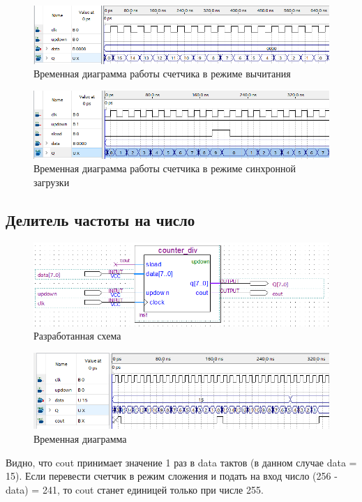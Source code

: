 \documentclass[a4paper,12pt]{article}
\begin{document}
    \begin{figure}[H]
        \centering
        \includegraphics[width=\linewidth]{wave_2_2}
        \caption{Временная диаграмма работы счетчика в режиме вычитания}
    \end{figure}

    \begin{figure}[H]
        \centering
        \includegraphics[width=\linewidth]{wave_2_3}
        \caption{Временная диаграмма работы счетчика в режиме синхронной загрузки}
    \end{figure}
    \subsection{Делитель частоты на число}
    \begin{figure}[H]
        \centering
        \includegraphics[width=\linewidth]{scheme_div}
        \caption{Разработанная схема}
    \end{figure}
    \begin{figure}[H]
        \centering
        \includegraphics[width=\linewidth]{wave_div}
        \caption{Временная диаграмма}
    \end{figure}
    Видно, что cout принимает значение 1 раз в data тактов (в данном случае data = 15). Если перевести
    счетчик в режим сложения и подать на вход число (256 - data) = 241, то cout станет единицей только при
    числе 255.
\end{document}
